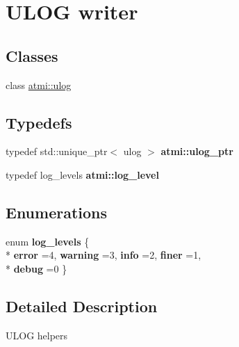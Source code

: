 \hypertarget{group__logging}{\section{U\+L\+O\+G writer}
\label{group__logging}
}
\subsection*{Classes}
\begin{DoxyCompactItemize}
\item 
class \hyperlink{classatmi_1_1ulog}{atmi\+::ulog}
\end{DoxyCompactItemize}
\subsection*{Typedefs}
\begin{DoxyCompactItemize}
\item 
\hypertarget{group__logging_gaa0869c7a6b1f7846685e2454b70b9e7a}{typedef std\+::unique\+\_\+ptr$<$ ulog $>$ {\bfseries atmi\+::ulog\+\_\+ptr}}\label{group__logging_gaa0869c7a6b1f7846685e2454b70b9e7a}

\item 
\hypertarget{group__logging_ga74d2cbe55d42a8a309e5535678fd9db3}{typedef log\+\_\+levels {\bfseries atmi\+::log\+\_\+level}}\label{group__logging_ga74d2cbe55d42a8a309e5535678fd9db3}

\end{DoxyCompactItemize}
\subsection*{Enumerations}
\begin{DoxyCompactItemize}
\item 
\hypertarget{group__logging_gaf9bdc466e66896621125b81d022264ca}{enum {\bfseries log\+\_\+levels} \{ \\*
{\bfseries error} =4, 
{\bfseries warning} =3, 
{\bfseries info} =2, 
{\bfseries finer} =1, 
\\*
{\bfseries debug} =0
 \}}\label{group__logging_gaf9bdc466e66896621125b81d022264ca}

\end{DoxyCompactItemize}


\subsection{Detailed Description}
U\+L\+O\+G helpers 